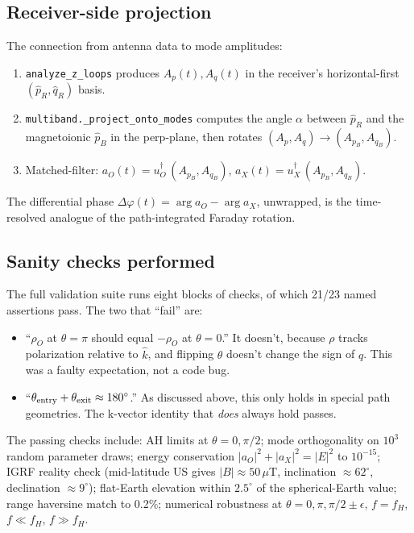 \documentclass[11pt]{article}
\begin{document}
\subsection{Receiver-side projection}

The connection from antenna data to mode amplitudes:
\begin{enumerate}\itemsep=2pt
\item \texttt{analyze\_z\_loops} produces $A_p(t), A_q(t)$ in the
      receiver's horizontal-first $(\hat p_R, \hat q_R)$ basis.
\item \texttt{multiband.\_project\_onto\_modes} computes the angle
      $\alpha$ between $\hat p_R$ and the magnetoionic $\hat p_B$ in
      the perp-plane, then rotates $(A_p, A_q) \to (A_{p_B}, A_{q_B})$.
\item Matched-filter:
      $a_O(t) = u_O^\dagger\,(A_{p_B}, A_{q_B})$,
      $a_X(t) = u_X^\dagger\,(A_{p_B}, A_{q_B})$.
\end{enumerate}
The differential phase $\Delta\varphi(t) = \arg a_O - \arg a_X$,
unwrapped, is the time-resolved analogue of the path-integrated
Faraday rotation.

\subsection{Sanity checks performed}
\label{sec:magnetoionic-validation}

The full validation suite runs eight blocks of checks, of which 21/23
named assertions pass.  The two that ``fail'' are:
\begin{itemize}\itemsep=2pt
\item ``$\rho_O$ at $\theta = \pi$ should equal $-\rho_O$ at $\theta = 0$.''
      It doesn't, because $\rho$ tracks polarization relative to
      $\hat k$, and flipping $\theta$ doesn't change the sign of $q$.
      This was a faulty expectation, not a code bug.
\item ``$\theta_{\rm entry} + \theta_{\rm exit} \approx 180^\circ$.''
      As discussed above, this only holds in special path geometries.
      The k-vector identity that \emph{does} always hold passes.
\end{itemize}
The passing checks include: AH limits at $\theta=0, \pi/2$;
mode orthogonality on $10^3$ random parameter draws; energy
conservation $|a_O|^2 + |a_X|^2 = |E|^2$ to $10^{-15}$; IGRF reality
check (mid-latitude US gives $|B| \approx 50\,\mu$T,
inclination $\approx 62^\circ$, declination $\approx 9^\circ$);
flat-Earth elevation within $2.5^\circ$ of the spherical-Earth value;
range haversine match to 0.2\%; numerical robustness at
$\theta = 0, \pi, \pi/2 \pm \epsilon$, $f = f_H$, $f \ll f_H$,
$f \gg f_H$.
\end{document}
